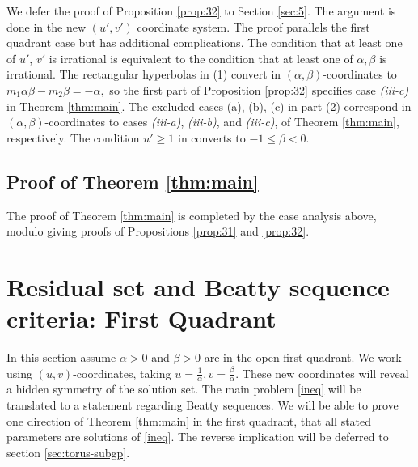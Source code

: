 \documentclass[12pt,letterpaper, reqno]{amsart}
\theoremstyle{definition}
\theoremstyle{remark}
\newcommand{\uu}{{u'}}
\newcommand{\vv}{{v'}}
\begin{document}
We defer the proof of Proposition \ref{prop:32} to Section \ref{sec:5}. 
The argument is done in the new $(\uu, \vv)$ coordinate system.
The proof parallels the first quadrant case but has additional  complications.
The condition that at least one of $\uu$, $\vv$ is irrational is equivalent
to the condition that at least one of $\alpha, \beta$ is irrational.  The
rectangular hyperbolas in (1)  convert in $(\alpha, \beta)$-coordinates
to $m_1 \alpha \beta - m_2 \beta= - \alpha,$
so the first part of Proposition \ref{prop:32} specifies case {\it (iii-c)} in
Theorem \ref{thm:main}. 
The excluded cases (a), (b), (c) in part (2) correspond  in $(\alpha, \beta)$-coordinates to cases 
{\it (iii-a)}, {\it (iii-b)}, and {\it (iii-c)}, of Theorem \ref{thm:main}, respectively.
The condition ${\uu} \ge 1$ in  converts to $-1 \le \beta <0.$ 


%
%
\subsection{Proof of Theorem \ref{thm:main}} \label{sec:34}


The proof of  Theorem \ref{thm:main} is completed by the  case analysis above,
modulo giving proofs of  Propositions \ref{prop:31} and \ref{prop:32}.




%
%
\section{Residual set and Beatty sequence criteria: First Quadrant} \label{sec:4}
\setcounter{equation}{0}

In this section assume $\alpha>0$ and $\beta >0$ are in the open first quadrant.
We  work using  $(u, v)$-coordinates, taking  $u= \frac{1}{\alpha}, v= \frac{\beta}{\alpha}$.
These new coordinates will reveal a hidden symmetry of the solution set.
The main problem \eqref{ineq} will be translated to a statement regarding Beatty sequences.
We will be able to prove one direction of Theorem \ref{thm:main} in the first quadrant, that all stated parameters are solutions of \eqref{ineq}. The reverse implication will be deferred to section \ref{sec:torus-subgp}.
\end{document}
